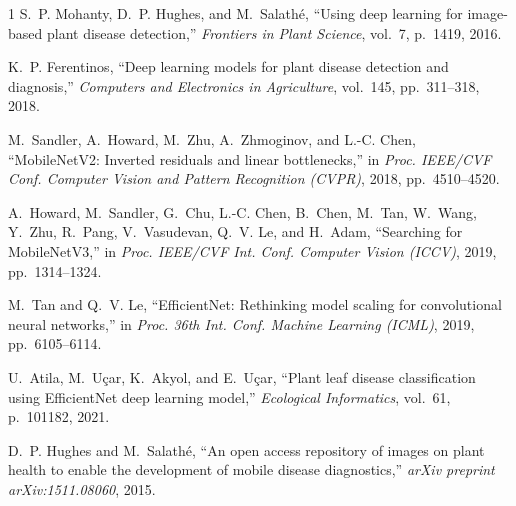 \documentclass[conference,a4paper]{IEEEtran}
\begin{document}
\balance
\begin{thebibliography}{1}
S.~P. Mohanty, D.~P. Hughes, and M.~Salath{\'e}, ``Using deep learning for image-based plant disease detection,'' \emph{Frontiers in Plant Science}, vol.~7, p.~1419, 2016.

K.~P. Ferentinos, ``Deep learning models for plant disease detection and diagnosis,'' \emph{Computers and Electronics in Agriculture}, vol.~145, pp.~311--318, 2018.

M.~Sandler, A.~Howard, M.~Zhu, A.~Zhmoginov, and L.-C. Chen, ``MobileNetV2: Inverted residuals and linear bottlenecks,'' in \emph{Proc. IEEE/CVF Conf. Computer Vision and Pattern Recognition (CVPR)}, 2018, pp.~4510--4520.

A.~Howard, M.~Sandler, G.~Chu, L.-C. Chen, B.~Chen, M.~Tan, W.~Wang, Y.~Zhu, R.~Pang, V.~Vasudevan, Q.~V. Le, and H.~Adam, ``Searching for MobileNetV3,'' in \emph{Proc. IEEE/CVF Int. Conf. Computer Vision (ICCV)}, 2019, pp.~1314--1324.

M.~Tan and Q.~V. Le, ``EfficientNet: Rethinking model scaling for convolutional neural networks,'' in \emph{Proc. 36th Int. Conf. Machine Learning (ICML)}, 2019, pp.~6105--6114.

U.~Atila, M.~U{\c{c}}ar, K.~Akyol, and E.~U{\c{c}}ar, ``Plant leaf disease classification using EfficientNet deep learning model,'' \emph{Ecological Informatics}, vol.~61, p.~101182, 2021.

D.~P. Hughes and M.~Salath{\'e}, ``An open access repository of images on plant health to enable the development of mobile disease diagnostics,'' \emph{arXiv preprint arXiv:1511.08060}, 2015.
\end{thebibliography}
\end{document}
